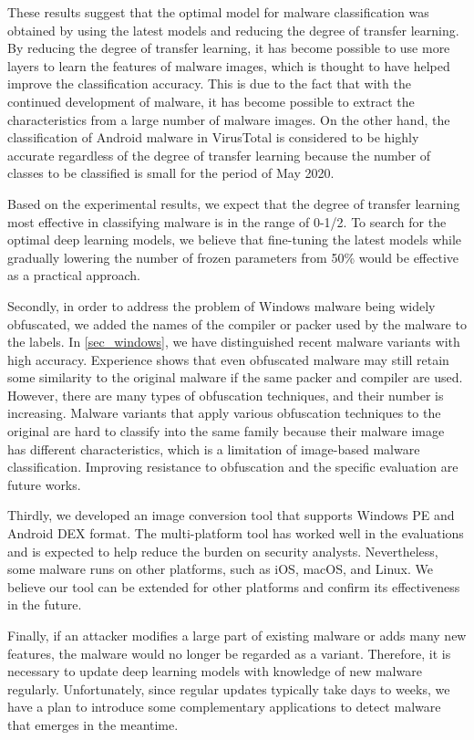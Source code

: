 \documentclass[conference]{IEEEtran}
\begin{document}
These results suggest that the optimal model for malware classification was obtained by using the latest models and reducing the degree of transfer learning.
By reducing the degree of transfer learning, it has become possible to use more layers to learn the features of malware images, which is thought to have helped improve the classification accuracy.
This is due to the fact that with the continued development of malware, it has become possible to extract the characteristics from a large number of malware images.
On the other hand, the classification of Android malware in VirusTotal is considered to be highly accurate regardless of the degree of transfer learning because the number of classes to be classified is small for the period of May 2020.

Based on the experimental results, we expect that the degree of transfer learning most effective in classifying malware is in the range of 0-1/2. 
To search for the optimal deep learning models, we believe that fine-tuning the latest models while gradually lowering the number of frozen parameters from 50\% would be effective as a practical approach.

Secondly, in order to address the problem of Windows malware being widely obfuscated, we added the names of the compiler or packer used by the malware to the labels.
In \autoref{sec_windows}, we have distinguished recent malware variants with high accuracy.
Experience shows that even obfuscated malware may still retain some similarity to the original malware if the same packer and compiler are used.
However, there are many types of obfuscation techniques, and their number is increasing. Malware variants that apply various obfuscation techniques to the original are hard to classify into the same family because their malware image has different characteristics, which is a limitation of image-based malware classification.
Improving resistance to obfuscation and the specific evaluation are future works.

Thirdly, we developed an image conversion tool that supports Windows PE and Android DEX format.
The multi-platform tool has worked well in the evaluations and is expected to help reduce the burden on security analysts.
Nevertheless, some malware runs on other platforms, such as iOS, macOS, and Linux.
We believe our tool can be extended for other platforms and confirm its effectiveness in the future.

Finally, if an attacker modifies a large part of existing malware or adds many new features, the malware would no longer be regarded as a variant.
Therefore, it is necessary to update deep learning models with knowledge of new malware regularly.
Unfortunately, since regular updates typically take days to weeks, we have a plan to introduce some complementary applications to detect malware that emerges in the meantime.
\end{document}
